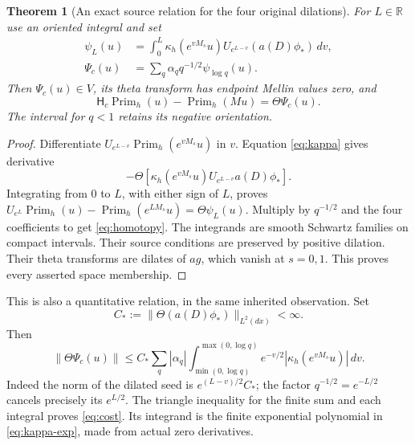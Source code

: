 \documentclass[11pt]{article}
\newtheorem{theorem}{Theorem}[section]
\newcommand{\R}{\mathbb R}
\newcommand{\PP}{\operatorname{Prim}_h}
\newcommand{\HS}{\mathsf H_c}
\newcommand{\dd}{\,d}
\begin{document}
\begin{theorem}[An exact source relation for the four original dilations]
For $L\in\R$ use an oriented integral and set
\begin{align}
 \psi_L(u)&=\int_0^L\kappa_h(e^{vM_s}u)
           U_{e^{L-v}}(a(D)\phi_*)\dd v,\nonumber\\
 \Psi_c(u)&=\sum_q\alpha_q q^{-1/2}\psi_{\log q}(u).
 \label{eq:psi}
\end{align}
Then $\Psi_c(u)\in V$, its theta transform has endpoint Mellin values
zero, and
\begin{equation}
 \HS\PP(u)-\PP(Mu)=\Theta\Psi_c(u).\label{eq:homotopy}
\end{equation}
The interval for $q<1$ retains its negative orientation.
\end{theorem}
\begin{proof}
Differentiate $U_{e^{L-v}}\PP(e^{vM_s}u)$ in $v$. Equation
\eqref{eq:kappa} gives derivative
\[
 -\Theta[\kappa_h(e^{vM_s}u)U_{e^{L-v}}a(D)\phi_*].
\]
Integrating from $0$ to $L$, with either sign of $L$, proves
$U_{e^L}\PP(u)-\PP(e^{LM_s}u)=\Theta\psi_L(u)$.
Multiply by $q^{-1/2}$ and the four coefficients to get
\eqref{eq:homotopy}. The integrands are smooth Schwartz families on
compact intervals. Their source conditions are preserved by positive
dilation. Their theta transforms are dilates of $ag$, which vanish
at $s=0,1$. This proves every asserted space membership.
\end{proof}

This is also a quantitative relation, in the same inherited observation.
Set
\[
 C_*:=\|\Theta(a(D)\phi_*)\|_{L^2(dx)}<\infty.
\]
Then
\begin{equation}
 \|\Theta\Psi_c(u)\|\le C_*\sum_q|\alpha_q|
   \int_{\min(0,\log q)}^{\max(0,\log q)}
      e^{-v/2}|\kappa_h(e^{vM_s}u)|\dd v.\label{eq:cost}
\end{equation}
Indeed the norm of the dilated seed is $e^{(L-v)/2}C_*$;
the factor $q^{-1/2}=e^{-L/2}$ cancels precisely its $e^{L/2}$.
The triangle inequality for the finite sum and each integral proves
\eqref{eq:cost}. Its integrand is the finite exponential polynomial
in \eqref{eq:kappa-exp}, made from actual zero derivatives.
\end{document}
